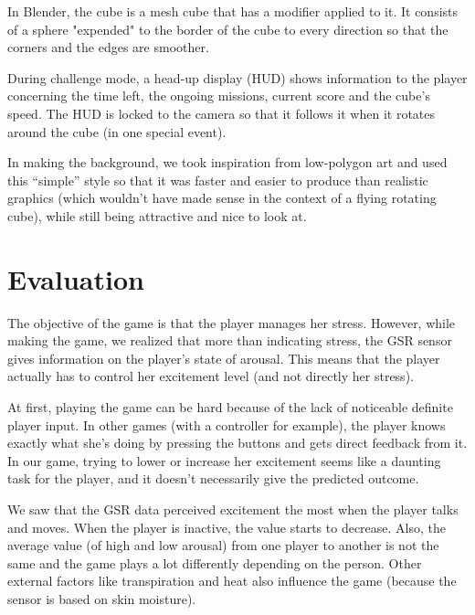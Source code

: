 \documentclass[12pt,a4paper]{article}
\begin{document}
In Blender, the cube is a mesh cube that has a modifier applied to it. It consists of a sphere "expended" to the border of the cube to every direction so that the corners and the edges are smoother.


During challenge mode, a head-up display (HUD) shows information to the player concerning the time left, the ongoing missions, current score and the cube's speed. The HUD is locked to the camera so that it follows it when it rotates around the cube (in one special event).

In making the background, we took inspiration from low-polygon art and used this ``simple'' style so that it was faster and easier to produce than realistic graphics (which wouldn't have made sense in the context of a flying rotating cube), while still being attractive and nice to look at.


\section{Evaluation}


The objective of the game is that the player manages her stress. However, while making the game, we realized that more than indicating stress, the GSR sensor gives information on the player's state of arousal. This means that the player actually has to control her excitement level (and not directly her stress).

At first, playing the game can be hard because of the lack of noticeable definite player input. In other games (with a controller for example), the player knows exactly what she's doing by pressing the buttons and gets direct feedback from it. In our game, trying to lower or increase her excitement seems like a daunting task for the player, and it doesn't necessarily give the predicted outcome. 

We saw that the GSR data perceived excitement the most when the player talks and moves. When the player is inactive, the value starts to decrease. Also, the average value (of high and low arousal) from one player to another is not the same and the game plays a lot differently depending on the person. Other external factors like transpiration and heat also influence the game (because the sensor is based on skin moisture).
\end{document}
